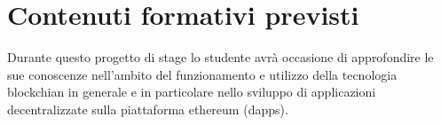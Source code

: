 \section*{Contenuti formativi previsti}
Durante questo progetto di stage lo studente avrà occasione di
approfondire le sue conoscenze nell'ambito del funzionamento e
utilizzo della tecnologia blockchian in generale e in particolare
nello sviluppo di applicazioni decentralizzate sulla piattaforma
ethereum (dapps).
\newpage
